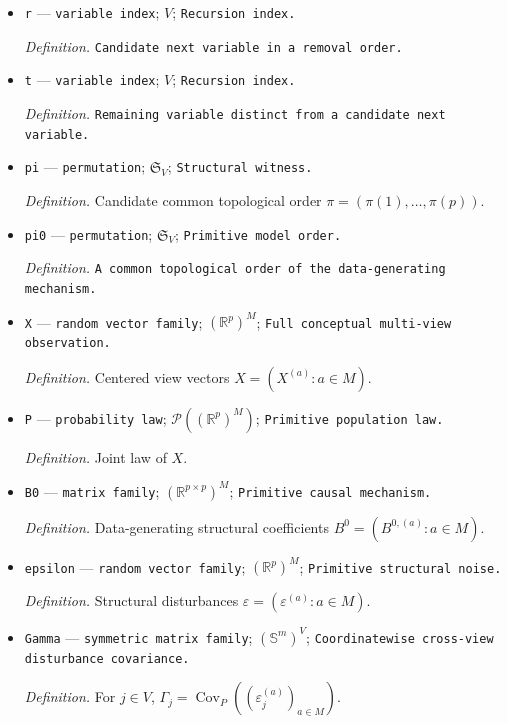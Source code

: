 \documentclass{article}
\begin{document}
\begin{itemize}
  \item \texttt{r} --- \texttt{variable index}; \(V\); \texttt{Recursion index.}
  \par\smallskip\noindent\emph{Definition.} \texttt{Candidate next variable in a removal order.}
  \item \texttt{t} --- \texttt{variable index}; \(V\); \texttt{Recursion index.}
  \par\smallskip\noindent\emph{Definition.} \texttt{Remaining variable distinct from a candidate next variable.}
  \item \texttt{pi} --- \texttt{permutation}; \(\mathfrak S_V\); \texttt{Structural witness.}
  \par\smallskip\noindent\emph{Definition.} Candidate common topological order \(\pi=(\pi(1),\ldots,\pi(p))\).
  \item \texttt{pi0} --- \texttt{permutation}; \(\mathfrak S_V\); \texttt{Primitive model order.}
  \par\smallskip\noindent\emph{Definition.} \texttt{A common topological order of the data-\allowbreak{}generating mechanism.}
  \item \texttt{X} --- \texttt{random vector family}; \((\mathbb R^p)^M\); \texttt{Full conceptual multi-\allowbreak{}view observation.}
  \par\smallskip\noindent\emph{Definition.} Centered view vectors \(X=(X^{(a)}:a\in M)\).
  \item \texttt{P} --- \texttt{probability law}; \(\mathcal P((\mathbb R^p)^M)\); \texttt{Primitive population law.}
  \par\smallskip\noindent\emph{Definition.} Joint law of \(X\).
  \item \texttt{B0} --- \texttt{matrix family}; \((\mathbb R^{p\times p})^M\); \texttt{Primitive causal mechanism.}
  \par\smallskip\noindent\emph{Definition.} Data-generating structural coefficients \(B^0=(B^{0,(a)}:a\in M)\).
  \item \texttt{epsilon} --- \texttt{random vector family}; \((\mathbb R^p)^M\); \texttt{Primitive structural noise.}
  \par\smallskip\noindent\emph{Definition.} Structural disturbances \(\varepsilon=(\varepsilon^{(a)}:a\in M)\).
  \item \texttt{Gamma} --- \texttt{symmetric matrix family}; \((\mathbb S^m)^V\); \texttt{Coordinatewise cross-\allowbreak{}view disturbance covariance.}
  \par\smallskip\noindent\emph{Definition.} For \(j\in V\), \(\Gamma_j=\operatorname{Cov}_P((\varepsilon_j^{(a)})_{a\in M})\).

\end{itemize}
\end{document}
